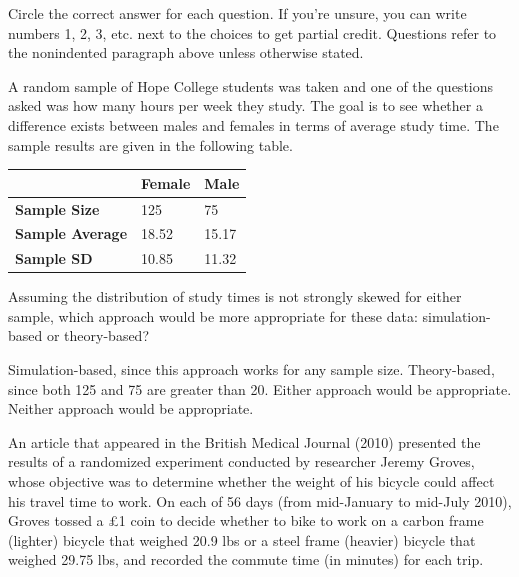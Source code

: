 \documentclass{article}
\begin{document}
	Circle the correct answer for each question.  If you're unsure, you can write numbers 1, 2, 3, etc. next to the choices to get partial credit.  Questions refer to the nonindented paragraph above unless otherwise stated.\\[.5cm]
	
	\begin{mcquestions}
			
		\begin{mcquestioninstruction}
			A random sample of Hope College students was taken and one of the questions asked was how many hours per week they study.  The goal is to see whether a difference exists between males and females in terms of average study time.  The sample results are given in the following table.
			\begin{center}
				\begin{tabular}{| l | l | l |}
					\hline
					& \textbf{Female} & \textbf{Male} \\
					\hline
					\textbf{Sample Size} & 125 & 75 \\
					\hline
					\textbf{Sample Average} & 18.52 & 15.17 \\
					\hline
					\textbf{Sample SD} & 10.85 & 11.32 \\
					\hline
				\end{tabular}
			\end{center}
		\end{mcquestioninstruction}
		
		\question Assuming the distribution of study times is not strongly skewed for either sample, which approach would be more appropriate for these data: simulation-based or theory-based?
		\begin{mcanswerslist}
			\answer Simulation-based, since this approach works for any sample size.
			\answer Theory-based, since both 125 and 75 are greater than 20.
			\answer[correct] Either approach would be appropriate.
			\answer Neither approach would be appropriate.
		\end{mcanswerslist}
		
		\begin{mcquestioninstruction}
			An article that appeared in the British Medical Journal (2010) presented the results of a randomized experiment conducted by researcher Jeremy Groves, whose objective was to determine whether the weight of his bicycle could affect his travel time to work. On each of 56 days (from mid-January to mid-July 2010), Groves tossed a £1 coin to decide whether to bike to work on a carbon frame (lighter) bicycle that weighed 20.9 lbs or a steel frame (heavier) bicycle that weighed 29.75 lbs, and recorded the commute time (in minutes) for each trip.
			

\end{mcquestioninstruction}
\end{mcquestions}
\end{document}
